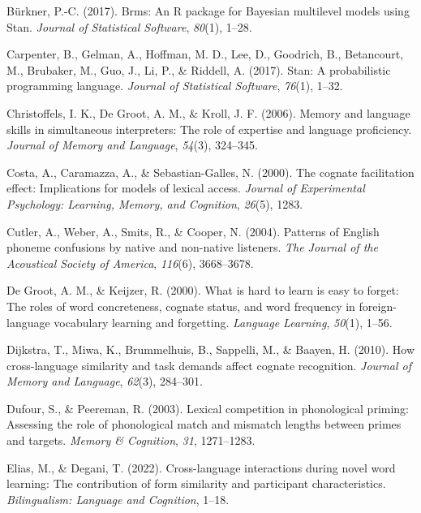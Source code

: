 \documentclass[
]{article}
\newlength{\cslhangindent}
\newenvironment{CSLReferences}[2] %
 {\begin{list}{}{%
  \setlength{\itemindent}{0pt}
  \setlength{\leftmargin}{0pt}
  \setlength{\parsep}{0pt}
  \ifodd #1
   \setlength{\leftmargin}{\cslhangindent}
   \setlength{\itemindent}{-1\cslhangindent}
  \fi
  \setlength{\itemsep}{#2\baselineskip}}}
 {\end{list}}
\begin{document}
\begin{CSLReferences}{1}{0}
Bürkner, P.-C. (2017). Brms: {An R} package for {Bayesian} multilevel
models using {Stan}. \emph{Journal of Statistical Software},
\emph{80}(1), 1--28.

Carpenter, B., Gelman, A., Hoffman, M. D., Lee, D., Goodrich, B.,
Betancourt, M., Brubaker, M., Guo, J., Li, P., \& Riddell, A. (2017).
Stan: {A} probabilistic programming language. \emph{Journal of
Statistical Software}, \emph{76}(1), 1--32.

Christoffels, I. K., De Groot, A. M., \& Kroll, J. F. (2006). Memory and
language skills in simultaneous interpreters: {The} role of expertise
and language proficiency. \emph{Journal of Memory and Language},
\emph{54}(3), 324--345.

Costa, A., Caramazza, A., \& Sebastian-Galles, N. (2000). The cognate
facilitation effect: Implications for models of lexical access.
\emph{Journal of Experimental Psychology: Learning, Memory, and
Cognition}, \emph{26}(5), 1283.

Cutler, A., Weber, A., Smits, R., \& Cooper, N. (2004). Patterns of
{English} phoneme confusions by native and non-native listeners.
\emph{The Journal of the Acoustical Society of America}, \emph{116}(6),
3668--3678.

De Groot, A. M., \& Keijzer, R. (2000). What is hard to learn is easy to
forget: The roles of word concreteness, cognate status, and word
frequency in foreign-language vocabulary learning and forgetting.
\emph{Language Learning}, \emph{50}(1), 1--56.

Dijkstra, T., Miwa, K., Brummelhuis, B., Sappelli, M., \& Baayen, H.
(2010). How cross-language similarity and task demands affect cognate
recognition. \emph{Journal of Memory and Language}, \emph{62}(3),
284--301.

Dufour, S., \& Peereman, R. (2003). Lexical competition in phonological
priming: {Assessing} the role of phonological match and mismatch lengths
between primes and targets. \emph{Memory \& Cognition}, \emph{31},
1271--1283.

Elias, M., \& Degani, T. (2022). Cross-language interactions during
novel word learning: {The} contribution of form similarity and
participant characteristics. \emph{Bilingualism: Language and
Cognition}, 1--18.


\end{CSLReferences}
\end{document}
